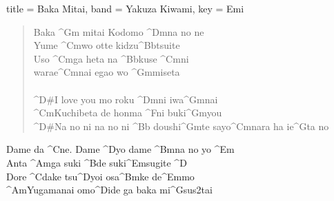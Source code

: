 \begin{song}[
	remember-chords = false ,
	verse/numbered = true ,
	transpose-capo = true 
	]{
		title = Baka Mitai,
		band = Yakuza Kiwami,
		key  = Emi
	}	
	\begin{verse}
		Baka ^{Gm} mitai Kodomo ^{Dm}na no ne \\
		Yume ^{Cm}wo otte kidzu^{Bb}tsuite
 \\
		Uso ^{Cm}ga heta na ^{Bb}kuse ^{Cm}ni \\
		warae^{Cm}nai egao wo ^{Gm}miseta
\\
		\\
		^{D#}I love you mo roku ^{Dm}ni iwa^{Gm}nai \\
		^{Cm}Kuchibeta de honma ^{F}ni buki^{Gm}you
\\
		^{D#}Na no ni na no ni ^{Bb} doushi^{Gm}te sayo^{Cm}nara ha ie^{G}ta no
\\
	\end{verse}

	\begin{chorus}
		
		Dame da ^{C}ne. Dame ^{D}yo dame ^{Bm}na no yo
^{Em} \\
		Anta ^{Am}ga suki ^{B}de suki^{Em}sugite ^{D} \\
		Dore ^{C}dake tsu^{D}yoi osa^{Bm}ke de^{Em}mo \\
		^{Am}Yugamanai omo^{D}ide ga baka mi^{Gsus2}tai \\
	\end{chorus}
\end{song}